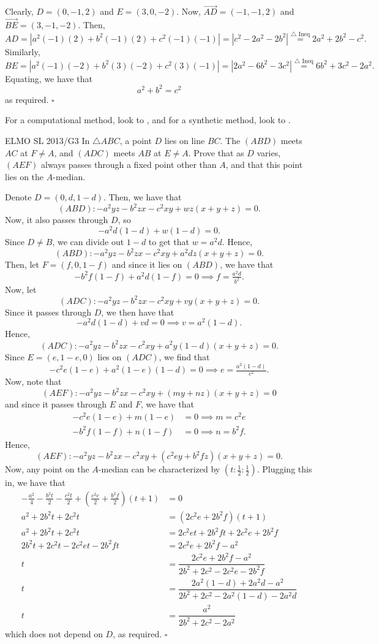 \documentclass{article}
\begin{document}
Clearly, $D = (0, -1, 2)$ and $E = (3, 0, -2)$. Now, $\overrightarrow{AD} = (-1, -1, 2)$ and $\overrightarrow{BE} = (3, -1, -2)$. Then, \[AD = \left|a^2(-1)(2)+b^2(-1)(2)+c^2(-1)(-1)\right| = \left|c^2-2a^2-2b^2\right| \stackrel{\triangle\text{ Ineq}}{=} 2a^2+2b^2-c^2.\] Similarly, \[BE = \left|a^2(-1)(-2)+b^2(3)(-2)+c^2(3)(-1)\right| = \left|2a^2-6b^2-3c^2\right| \stackrel{\triangle\text{ Ineq}}{=} 6b^2+3c^2-2a^2.\] Equating, we have that \[a^2+b^2 = c^2\] as required. $\square$

\begin{remark*}
For a computational method, look to , and for a synthetic method, look to .
\end{remark*}

\begin{problem}[7.35]{ELMO SL 2013/G3}
In $\triangle ABC$, a point $D$ lies on line $BC$. The $(ABD)$ meets $AC$ at $F \neq A$, and $(ADC)$ meets $AB$ at $E \neq A$. Prove that as $D$ varies, $(AEF)$ always passes through a fixed point other than $A$, and that this point lies on the $A$-median.
\end{problem}

Denote $D = (0, d, 1-d)$. Then, we have that \[(ABD): -a^2yz-b^2zx-c^2xy + wz(x+y+z) = 0.\] Now, it also passes through $D$, so \[-a^2d(1-d)+w(1-d) = 0.\] Since $D \neq B$, we can divide out $1-d$ to get that $w = a^2d$. Hence, \[(ABD): -a^2yz-b^2zx-c^2xy + a^2dz(x+y+z) = 0.\] Then, let $F = (f, 0, 1-f)$ and since it lies on $(ABD)$, we have that \[-b^2f(1-f)+a^2d(1-f) = 0 \implies f = \tfrac{a^2d}{b^2}.\] Now, let \[(ADC): -a^2yz-b^2zx-c^2xy + vy(x+y+z) = 0.\] Since it passes through $D$, we then have that \[-a^2d(1-d)+vd = 0 \implies v = a^2(1-d).\] Hence, \[(ADC): -a^2yz-b^2zx-c^2xy + a^2y(1-d)(x+y+z) = 0.\] Since $E = (e, 1-e, 0)$ lies on $(ADC)$, we find that \[-c^2e(1-e)+a^2(1-e)(1-d) = 0 \implies e = \tfrac{a^2(1-d)}{c^2}.\] Now, note that \[(AEF) : -a^2yz-b^2zx-c^2xy+(my+nz)(x+y+z) = 0\] and since it passes through $E$ and $F$, we have that
\begin{align*}
-c^2e(1-e)+m(1-e) &= 0 \implies m = c^2e \\
-b^2f(1-f)+n(1-f) &= 0 \implies n = b^2f.
\end{align*}
Hence, \[(AEF) : -a^2yz-b^2zx-c^2xy+(c^2ey+b^2fz)(x+y+z) = 0.\] Now, any point on the $A$-median can be characterized by $\left(t : \tfrac{1}{2} : \tfrac{1}{2}\right)$. Plugging this in, we have that
\begin{align*}
-\tfrac{a^2}{4}-\tfrac{b^2t}{2}-\tfrac{c^2t}{2}+\left(\frac{c^2e}{2}+\tfrac{b^2f}{2}\right)(t+1) &= 0 \\
a^2+2b^2t+2c^2t &= (2c^2e+2b^2f)(t+1) \\
a^2+2b^2t+2c^2t &= 2c^2et+2b^2ft+2c^2e+2b^2f \\
2b^2t+2c^2t-2c^2et-2b^2ft &= 2c^2e+2b^2f-a^2 \\
t &= \dfrac{2c^2e+2b^2f-a^2}{2b^2+2c^2-2c^2e-2b^2f} \\
t &= \dfrac{2a^2(1-d)+2a^2d-a^2}{2b^2+2c^2-2a^2(1-d)-2a^2d} \\
t &= \dfrac{a^2}{2b^2+2c^2-2a^2}
\end{align*}
which does not depend on $D$, as required. $\square$
\end{document}
